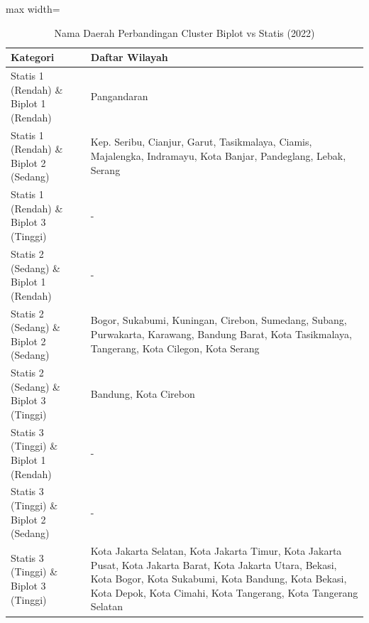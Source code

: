 \begin{table}[H]
\centering
\caption{Nama Daerah Perbandingan Cluster Biplot vs Statis (2022)} \label{tab:appbiplot_statis_name_2022}
\begin{adjustbox}{max width=\textwidth}
\begin{tabular}{|p{4cm}|p{10cm}|}
\hline
\textbf{Kategori} & \textbf{Daftar Wilayah} \\
\hline
Statis 1 (Rendah) \& Biplot 1 (Rendah) & Pangandaran \\
\hline
Statis 1 (Rendah) \& Biplot 2 (Sedang) & Kep. Seribu, Cianjur, Garut, Tasikmalaya, Ciamis, Majalengka, Indramayu, Kota Banjar, Pandeglang, Lebak, Serang \\
\hline
Statis 1 (Rendah) \& Biplot 3 (Tinggi) & - \\
\hline
Statis 2 (Sedang) \& Biplot 1 (Rendah) & - \\
\hline
Statis 2 (Sedang) \& Biplot 2 (Sedang) & Bogor, Sukabumi, Kuningan, Cirebon, Sumedang, Subang, Purwakarta, Karawang, Bandung Barat, Kota Tasikmalaya, Tangerang, Kota Cilegon, Kota Serang \\
\hline
Statis 2 (Sedang) \& Biplot 3 (Tinggi) & Bandung, Kota Cirebon \\
\hline
Statis 3 (Tinggi) \& Biplot 1 (Rendah) & - \\
\hline
Statis 3 (Tinggi) \& Biplot 2 (Sedang) & - \\
\hline
Statis 3 (Tinggi) \& Biplot 3 (Tinggi) & Kota Jakarta Selatan, Kota Jakarta Timur, Kota Jakarta Pusat, Kota Jakarta Barat, Kota Jakarta Utara, Bekasi, Kota Bogor, Kota Sukabumi, Kota Bandung, Kota Bekasi, Kota Depok, Kota Cimahi, Kota Tangerang, Kota Tangerang Selatan \\
\hline
\end{tabular}
\end{adjustbox}
\end{table}